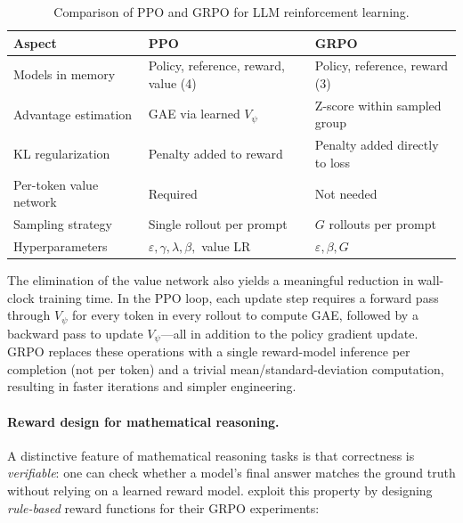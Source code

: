 \begin{table}[t]
\centering
\caption{Comparison of PPO and GRPO for LLM reinforcement learning.}
\label{tab:ppo-vs-grpo}
\small
\begin{tabular}{@{}lll@{}}
\toprule
\textbf{Aspect} & \textbf{PPO} & \textbf{GRPO} \\
\midrule
Models in memory &
  Policy, reference, reward, value (4) &
  Policy, reference, reward (3) \\
Advantage estimation &
  GAE via learned $V_\psi$ &
  Z-score within sampled group \\
KL regularization &
  Penalty added to reward &
  Penalty added directly to loss \\
Per-token value network &
  Required &
  Not needed \\
Sampling strategy &
  Single rollout per prompt &
  $G$ rollouts per prompt \\
Hyperparameters &
  $\varepsilon, \gamma, \lambda, \beta,$ value LR &
  $\varepsilon, \beta, G$ \\
\bottomrule
\end{tabular}
\end{table}

The elimination of the value network also yields a meaningful reduction in
wall-clock training time.  In the PPO loop, each update step requires a
forward pass through $V_\psi$ for every token in every rollout to compute
GAE, followed by a backward pass to update $V_\psi$---all in addition to
the policy gradient update.  GRPO replaces these operations with a single
reward-model inference per completion (not per token) and a trivial
mean/standard-deviation computation, resulting in faster iterations and
simpler engineering.

\paragraph{Reward design for mathematical reasoning.}
A distinctive feature of mathematical reasoning tasks is that correctness
is \emph{verifiable}: one can check whether a model's final answer matches
the ground truth without relying on a learned reward model.
\cite{shao2024deepseekmath} exploit this property by designing
\emph{rule-based} reward functions for their GRPO experiments:

